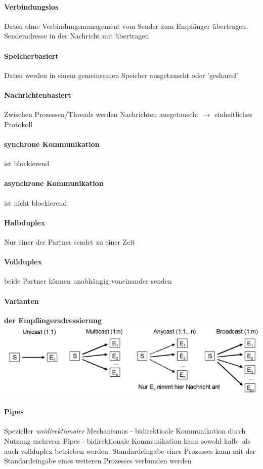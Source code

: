 \documentclass[11pt,a4paper,landscape]{article}
\begin{document}
\begin{multicols*}{3}
	\paragraph{Verbindungslos} Daten ohne Verbindungsmanagement vom Sender zum Empfänger übertragen. Senderadresse in der Nachricht mit übertragen
	\paragraph{Speicherbasiert} Daten werden in einem gemeinsamen Speicher ausgetauscht oder 'geshared'
	\paragraph{Nachrichtenbasiert} Zwischen Prozessen/Threads werden Nachrichten ausgetauscht $\rightarrow$ einheitliches Protokoll
	\paragraph{synchrone Kommunikation} ist blockierend
	\paragraph{asynchrone Kommunikation} ist nicht blockierend
	\paragraph{Halbduplex} Nur einer der Partner sendet zu einer Zeit
	\paragraph{Vollduplex} beide Partner können unabhängig voneinander senden
	\paragraph{Varianten} \textbf{der Empfängeradressierung}\\
	\includegraphics[width=0.8\columnwidth]{adressierung}
	\paragraph{Pipes} Spezieller \textit{unidirektionaler} Mechanismus - bidirektioale Kommunikation durch Nutzung mehrerer Pipes - bidirektionale Kommunikation kann sowohl halb- als auch vollduplex betrieben werden. Standardeingabe eines Prozesses kann mit der Standardeingabe eines weiteren Prozesses verbunden werden

\end{multicols*}
\end{document}
